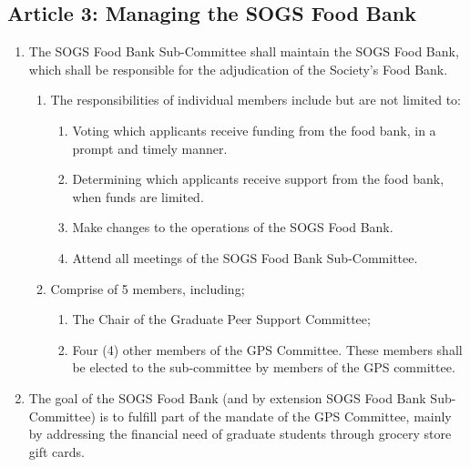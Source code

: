\subsection{Article 3: Managing the SOGS Food Bank}
\begin{enumerate}[label*=\arabic*., align=left]	
\item The SOGS Food Bank Sub-Committee shall maintain the SOGS Food Bank, which shall be responsible for the adjudication of the Society’s Food Bank.
\begin{enumerate}[label*=\arabic*., align=left]	
\item The responsibilities of individual members include but are not limited to:
\begin{enumerate}[label*=\arabic*., align=left]
\item Voting which applicants receive funding from the food bank, in a prompt and timely manner.
\item Determining which applicants receive support from the food bank, when funds are limited.
\item Make changes to the operations of the SOGS Food Bank.
\item Attend all meetings of the SOGS Food Bank Sub-Committee.
\end{enumerate}
\item Comprise of 5 members, including;
\begin{enumerate}[label*=\arabic*., align=left]
\item The Chair of the Graduate Peer Support Committee;
\item Four (4) other members of the GPS Committee. These members shall be elected to the sub-committee by members of the GPS committee.
\end{enumerate}
\end{enumerate}
\item The goal of the SOGS Food Bank (and by extension SOGS Food Bank Sub-Committee) is to fulfill part of the mandate of the GPS Committee, mainly by addressing the financial need of graduate students through grocery store gift cards.
\end{enumerate}